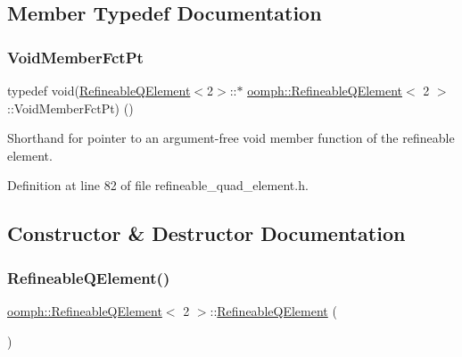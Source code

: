 \subsection{Member Typedef Documentation}
\mbox{\label{classoomph_1_1RefineableQElement_3_012_01_4_a418221e0f1056066064405e6f0795383}} 
\subsubsection{\texorpdfstring{Void\+Member\+Fct\+Pt}{VoidMemberFctPt}}
{\footnotesize\ttfamily typedef void(\hyperlink{classoomph_1_1RefineableQElement}{Refineable\+Q\+Element}$<$2$>$\+::$\ast$ \hyperlink{classoomph_1_1RefineableQElement}{oomph\+::\+Refineable\+Q\+Element}$<$ 2 $>$\+::Void\+Member\+Fct\+Pt) ()}



Shorthand for pointer to an argument-\/free void member function of the refineable element. 



Definition at line 82 of file refineable\+\_\+quad\+\_\+element.\+h.



\subsection{Constructor \& Destructor Documentation}
\mbox{\label{classoomph_1_1RefineableQElement_3_012_01_4_a86f01d876e3a09794ff05833e35363e4}} 
\subsubsection{\texorpdfstring{Refineable\+Q\+Element()}{RefineableQElement()}\hspace{0.1cm}{\footnotesize\ttfamily [1/2]}}
{\footnotesize\ttfamily \hyperlink{classoomph_1_1RefineableQElement}{oomph\+::\+Refineable\+Q\+Element}$<$ 2 $>$\+::\hyperlink{classoomph_1_1RefineableQElement}{Refineable\+Q\+Element} (\begin{DoxyParamCaption}{ }\end{DoxyParamCaption})\hspace{0.3cm}{\ttfamily [inline]}}



